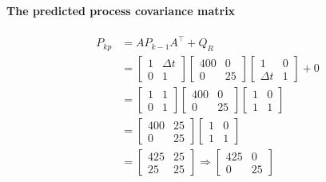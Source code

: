 \paragraph{The predicted process covariance matrix}
$$
\begin{aligned}
P_{k p} &=A P_{k-1} A^{\top}+Q_R \\
&=\left[\begin{array}{ll}
1 & \Delta t \\
0 & 1
\end{array}\right]\left[\begin{array}{cc}
400 & 0 \\
0 & 25
\end{array}\right]\left[\begin{array}{ll}
1 & 0 \\
\Delta t & 1
\end{array}\right]+0 \\
&=\left[\begin{array}{ll}
1 & 1 \\
0 & 1
\end{array}\right]\left[\begin{array}{cc}
400 & 0 \\
0 & 25
\end{array}\right]\left[\begin{array}{ll}
1 & 0 \\
1 & 1
\end{array}\right] \\
&=\left[\begin{array}{cc}
400 & 25 \\
0 & 25
\end{array}\right]\left[\begin{array}{ll}
1 & 0 \\
1 & 1
\end{array}\right] \\
&=\left[\begin{array}{ll}
425 & 25 \\
25 & 25
\end{array}\right] \Rightarrow\left[\begin{array}{cc}
425 & 0 \\
0 & 25
\end{array}\right]
\end{aligned}
$$
